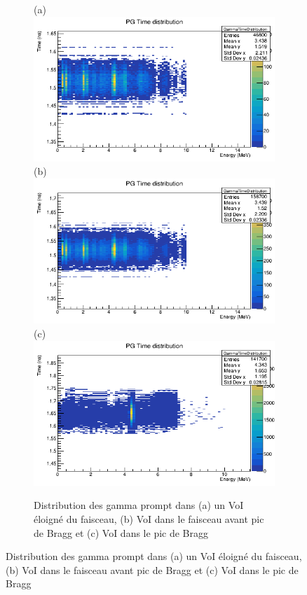 \documentclass[11pt,a4paper,oldfontcommands]{memoir}
\begin{document}
\begin{figure}
\begin{figure}[h!]
\end{figure}

\begin{figure}[h!]
\centering
\subfloat(a){\includegraphics[scale=0.3]{homo/PG/away.png}}
\subfloat(b){\includegraphics[scale=0.3]{homo/PG/preBragg.png}}\\
\subfloat(c){\includegraphics[scale=0.3]{homo/PG/postBragg.png}}
\label{homo pg}
\caption{ Distribution des gamma prompt dans (a) un VoI éloigné du faisceau, (b) VoI dans le faisceau avant pic de Bragg et (c) VoI dans le pic de Bragg }


\end{figure}
\end{figure}
\end{document}
